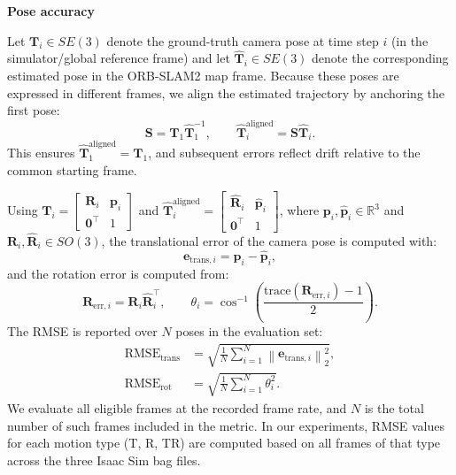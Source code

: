 \documentclass[letterpaper, 10 pt, conference]{IEEEtran}  %
\begin{document}
\noindent\textbf{Pose accuracy}

Let $\mathbf{T}_i\in SE(3)$ denote the ground-truth camera pose at time step $i$ (in the simulator/global reference frame) and let $\hat{\mathbf{T}}_i\in SE(3)$ denote the corresponding estimated pose in the ORB-SLAM2 map frame. Because these poses are expressed in different frames, we align the estimated trajectory by anchoring the first pose:
\begin{equation}
\mathbf{S}=\mathbf{T}_1\hat{\mathbf{T}}_1^{-1}, \qquad
\hat{\mathbf{T}}^{\mathrm{aligned}}_i=\mathbf{S}\hat{\mathbf{T}}_i.
\label{eq:traj_align}
\end{equation}
This ensures $\hat{\mathbf{T}}^{\mathrm{aligned}}_1=\mathbf{T}_1$, and subsequent errors reflect drift relative to the common starting frame.

Using  $\mathbf{T}_i=\begin{bmatrix}\mathbf{R}_i & \mathbf{p}_i\\ \mathbf{0}^\top & 1\end{bmatrix}$ and $\hat{\mathbf{T}}^{\mathrm{aligned}}_i=\begin{bmatrix}\hat{\mathbf{R}}_i & \hat{\mathbf{p}}_i\\ \mathbf{0}^\top & 1\end{bmatrix}$, where $\mathbf{p}_i,\hat{\mathbf{p}}_i\in\mathbb{R}^3$ and $\mathbf{R}_i,\hat{\mathbf{R}}_i\in SO(3)$, the translational error of the camera pose is computed with: 
\begin{equation}
\mathbf{e}_{\mathrm{trans},i}=\mathbf{p}_i-\hat{\mathbf{p}}_i,
\label{eq:etrans}
\end{equation}
and the rotation error is computed from:
\begin{equation}
\mathbf{R}_{\mathrm{err},i}=\mathbf{R}_i\hat{\mathbf{R}}_i^\top,
\qquad
\theta_i=\cos^{-1}\!\left(\frac{\mathrm{trace}(\mathbf{R}_{\mathrm{err},i})-1}{2}\right).
\label{eq:rot_err}
\end{equation}
The RMSE is reported over $N$ poses in the evaluation set:
\begin{equation}
\begin{aligned}
\mathrm{RMSE}_{\mathrm{trans}} &= \sqrt{\frac{1}{N}\sum_{i=1}^{N}\left\lVert\mathbf{e}_{\mathrm{trans},i}\right\rVert_2^2},\\
\mathrm{RMSE}_{\mathrm{rot}}   &= \sqrt{\frac{1}{N}\sum_{i=1}^{N}\theta_i^2}.
\end{aligned}
\label{eq:rmse_pose}
\end{equation}
We evaluate all eligible frames at the recorded frame rate, and \(N\) is the total number of such frames included in the metric. In our experiments, RMSE values for each motion type (T, R, TR) are computed based on all frames of that type across the three Isaac Sim bag files.
\end{document}
